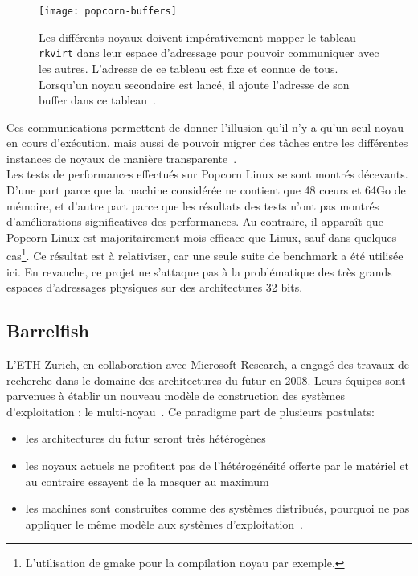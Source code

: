      \begin{figure}[ht]
        \centering
        \texttt{[image: popcorn-buffers]}
        \caption{Les différents noyaux doivent impérativement mapper le tableau
          \texttt{rkvirt} dans leur espace d'adressage pour pouvoir communiquer
          avec les autres. L'adresse de ce tableau est fixe et connue de tous.
          Lorsqu'un noyau secondaire est lancé, il ajoute l'adresse de son
          buffer dans ce tableau~\citep{barbalacepopcorn}.}
        \label{fig:popcorn-buf}
      \end{figure}

      Ces communications permettent de donner l’illusion qu’il n’y a qu’un seul
      noyau en cours d’exécution, mais aussi de pouvoir migrer des tâches entre
      les différentes instances de noyaux de manière
      transparente~\citep{katz2013popcorn}.\\

      Les tests de performances effectués sur Popcorn Linux se sont montrés
      décevants. D'une part parce que la machine considérée ne contient que 48
      c\oe urs et 64Go de mémoire, et d'autre part parce que les résultats des
      tests n'ont pas montrés d'améliorations significatives des
      performances. Au contraire, il apparaît que Popcorn Linux est
      majoritairement mois efficace que Linux, sauf dans quelques
      cas\footnote{L'utilisation de gmake pour la compilation noyau par
        exemple.}. Ce résultat est à relativiser, car une seule suite de
      benchmark a été utilisée ici. En revanche, ce projet ne s'attaque pas à la
      problématique des très grands espaces d'adressages physiques sur des
      architectures 32 bits.


    \subsection{Barrelfish}
      
      L’ETH Zurich, en collaboration avec Microsoft Research, a engagé des
      travaux de recherche dans le domaine des architectures du futur en
      2008. Leurs équipes sont parvenues à établir un nouveau modèle de
      construction des systèmes d’exploitation : le
      multi-noyau~\citep{baumann2009multikernel}. Ce paradigme part de plusieurs
      postulats:
      \begin{itemize}
        \item les architectures du futur seront très
          hétérogènes~\citep{schupbach2008embracing}
        \item les noyaux actuels ne profitent pas de l’hétérogénéité offerte par
          le matériel et au contraire essayent de la masquer au maximum
        \item les machines sont construites comme des systèmes distribués,
          pourquoi ne pas appliquer le même modèle aux systèmes
          d’exploitation~\citep{baumann2009your}.\\
      \end{itemize}

